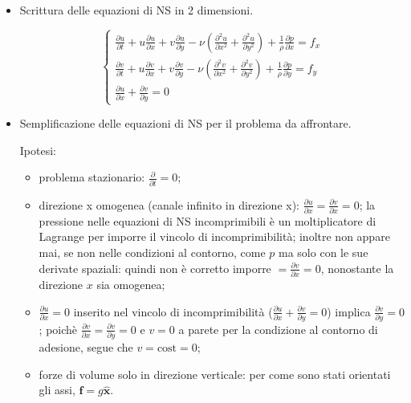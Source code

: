 \begin{itemize}

  \item Scrittura delle equazioni di NS in 2 dimensioni.
  
 \begin{equation}
\begin{cases}
  \frac{\partial u}{\partial t} + u \frac{\partial u}{\partial x}
  + v \frac{\partial u}{\partial y} - \nu \left( 
  \frac{\partial^2 u}{\partial x^2} +
  \frac{\partial^2 u}{\partial y^2} \right)
   + \frac{1}{\rho} \frac{\partial p}{\partial x} = f_x \\
  \frac{\partial v}{\partial t} + u \frac{\partial v}{\partial x}
  + v \frac{\partial v}{\partial y} - \nu \left( 
  \frac{\partial^2 v}{\partial x^2} +
  \frac{\partial^2 v}{\partial y^2} \right)
  + \frac{1}{\rho}  \frac{\partial p}{\partial y} = f_y \\
  \frac{\partial u}{\partial x} + \frac{\partial v}{\partial y} = 0
\end{cases}
\end{equation}

  \item Semplificazione delle equazioni di NS per il problema da affrontare.
  
Ipotesi: 
\begin{itemize}
\item problema stazionario: $\frac{\partial}{\partial t} = 0$;
\item direzione x omogenea (canale infinito in direzione x): $\frac{\partial u}{\partial x} = \frac{\partial v}{\partial x} = 0$; 
la pressione nelle equazioni di NS incomprimibili è un moltiplicatore di Lagrange per imporre il vincolo di incomprimibilità; inoltre non appare mai, se non nelle condizioni al contorno, come $p$ ma solo con le sue derivate spaziali: quindi non è corretto imporre $= \frac{\partial v}{\partial x} = 0$, nonostante la direzione $x$ sia omogenea;
\item $\frac{\partial u}{\partial x} = 0$ inserito nel vincolo di incomprimibilità ($\frac{\partial u}{\partial x}+\frac{\partial v}{\partial y}=0$) implica $\frac{\partial v}{\partial y}=0$; poichè $\frac{\partial v}{\partial x}=\frac{\partial v}{\partial y}=0$ e $v = 0$ a parete per la condizione al contorno di adesione, segue che $v = \text{cost} = 0$;
\item forze di volume solo in direzione verticale: per come sono stati orientati gli assi, $\bm{f} = g \hat{\bm{x}}$.
\end{itemize}
  

\end{itemize}
